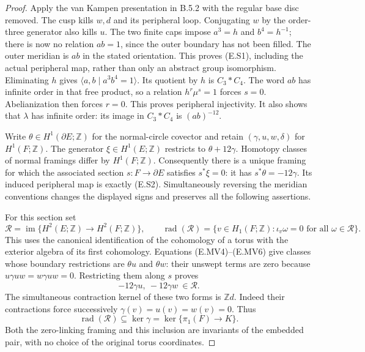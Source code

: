 \begin{proof}
Apply the van Kampen presentation in B.5.2 with the regular base disc
removed. The cusp kills $w,d$ and its peripheral loop. Conjugating
$w$ by the order-three generator also kills $u$. The two finite caps
impose $a^3=h$ and $b^4=h^{-1}$; there is now no relation $ab=1$,
since the outer boundary has not been filled. The outer meridian
is $ab$ in the stated orientation. This proves (E.S1), including
the actual peripheral map, rather than only an abstract group
isomorphism. Eliminating $h$ gives $\langle a,b\mid a^3b^4=1\rangle$.
Its quotient by $h$ is $C_3*C_4$. The word $ab$ has infinite order
in that free product, so a relation $h^r\mu^s=1$ forces $s=0$.
Abelianization then forces $r=0$. This proves peripheral injectivity.
It also shows that $\lambda$ has infinite order: its image in
$C_3*C_4$ is $(ab)^{-12}$.

Write $\theta\in H^1(\partial E;\mathbb Z)$ for the normal-circle
covector and retain $(\gamma,u,w,\delta)$ for $H^1(F;\mathbb Z)$.
The generator $\xi\in H^1(E;\mathbb Z)$ restricts to
$\theta+12\gamma$. Homotopy classes of normal framings differ by
$H^1(F;\mathbb Z)$. Consequently there is a unique framing for
which the associated section $s:F\to\partial E$ satisfies
$s^*\xi=0$: it has $s^*\theta=-12\gamma$. Its induced peripheral
map is exactly (E.S2). Simultaneously reversing the meridian
conventions changes the displayed signs and preserves all the
following assertions.

For this section set
\[
 \mathcal R=\operatorname{im}\{H^2(E;\mathbb Z)
                         \longrightarrow H^2(F;\mathbb Z)\},
 \qquad
 \operatorname{rad}(\mathcal R)=
 \{v\in H_1(F;\mathbb Z):\iota_v\omega=0
                                    \text{ for all }\omega\in\mathcal R\}.
 \tag{E.S3}
\]
This uses the canonical identification of the cohomology of a torus
with the exterior algebra of its first cohomology. Equations
(E.MV4)--(E.MV6) give classes whose boundary restrictions are
$\theta u$ and $\theta w$: their unswept terms are zero because
$u\gamma uw=w\gamma uw=0$. Restricting them along $s$ proves
\[
                -12\gamma u,\ -12\gamma w\ \in\mathcal R.
 \tag{E.S4}
\]
The simultaneous contraction kernel of these two forms is
$\mathbb Z d$. Indeed their contractions force successively
$\gamma(v)=u(v)=w(v)=0$. Thus
\[
       \operatorname{rad}(\mathcal R)\subseteq\ker\gamma
        =\ker\{\pi_1(F)\longrightarrow K\}.
 \tag{E.S5}
\]
Both the zero-linking framing and this inclusion are invariants of
the embedded pair, with no choice of the original torus coordinates.


\end{proof}
